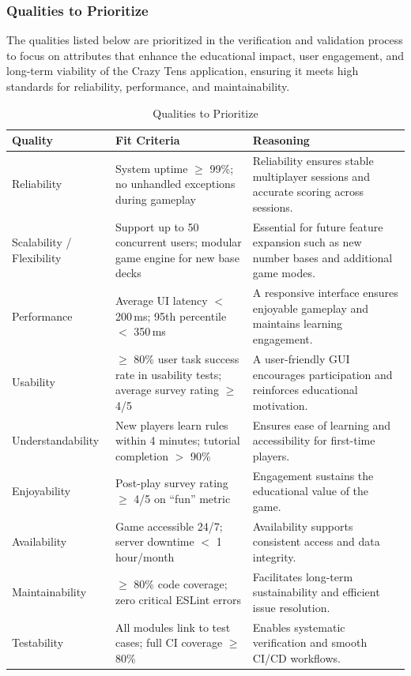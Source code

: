 \documentclass[12pt, titlepage]{article}
\begin{document}
\subsubsection{Qualities to Prioritize}
The qualities listed below are prioritized in the verification and validation process to focus on attributes that enhance the educational impact, user engagement, and long-term viability of the Crazy Tens application, ensuring it meets high standards for reliability, performance, and maintainability.
\begin{table}[H]
\centering
\caption{Qualities to Prioritize}
\begin{tabularx}{\textwidth}{p{3cm}p{4.5cm}X}
\toprule
\textbf{Quality} & \textbf{Fit Criteria} & \textbf{Reasoning} \\
\midrule
Reliability & System uptime $\geq$ 99\%; no unhandled exceptions during gameplay & Reliability ensures stable multiplayer sessions and accurate scoring across sessions. \\
Scalability / Flexibility & Support up to 50 concurrent users; modular game engine for new base decks & Essential for future feature expansion such as new number bases and additional game modes. \\
Performance & Average UI latency $<$ 200\,ms; 95th percentile $<$ 350\,ms & A responsive interface ensures enjoyable gameplay and maintains learning engagement. \\
Usability & $\geq$ 80\% user task success rate in usability tests; average survey rating $\geq$ 4/5 & A user-friendly GUI encourages participation and reinforces educational motivation. \\
Understandability & New players learn rules within 4 minutes; tutorial completion $>$ 90\% & Ensures ease of learning and accessibility for first-time players. \\
Enjoyability & Post-play survey rating $\geq$ 4/5 on ``fun'' metric & Engagement sustains the educational value of the game. \\
Availability & Game accessible 24/7; server downtime $<$ 1 hour/month & Availability supports consistent access and data integrity. \\
Maintainability & $\geq$ 80\% code coverage; zero critical ESLint errors & Facilitates long-term sustainability and efficient issue resolution. \\
Testability & All modules link to test cases; full CI coverage $\geq$ 80\% & Enables systematic verification and smooth CI/CD workflows. \\
\bottomrule
\end{tabularx}
\end{table}
\end{document}
